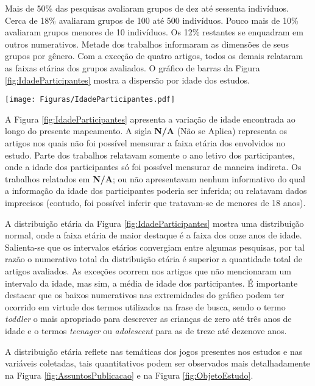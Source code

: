 \documentclass[12pt]{article}
\begin{document}
Mais de 50\% das pesquisas avaliaram grupos de dez até sessenta indivíduos. Cerca de 18\% avaliaram grupos de 100 até 500 indivíduos. Pouco mais de 10\% avaliaram grupos menores de 10 indivíduos. Os 12\% restantes se enquadram em outros numerativos. Metade dos trabalhos informaram as dimensões de seus grupos por gênero. Com a exceção de quatro artigos, todos os demais relataram as faixas etárias dos grupos avaliados. O gráfico de barras da Figura \ref{fig:IdadeParticipantes} mostra a dispersão por idade dos estudos.

\pagebreak

\begin{figure*}[ht]
\centering
\texttt{[image: Figuras/IdadeParticipantes.pdf]}
\caption{Distribuição da idade dos participantes dos artigos}\label{fig:IdadeParticipantes}
\end{figure*}

A Figura \ref{fig:IdadeParticipantes} apresenta a variação de idade encontrada ao longo do presente mapeamento. A sigla \textbf{N/A} (Não se Aplica) representa os artigos nos quais não foi possível mensurar a faixa etária dos envolvidos no estudo. Parte dos trabalhos relatavam somente o ano letivo dos participantes, onde a idade dos participantes só foi possível mensurar de maneira indireta. Os trabalhos relatados em \textbf{N/A}; ou não apresentavam nenhum informativo do qual a informação da idade dos participantes poderia ser inferida; ou relatavam dados imprecisos (contudo, foi possível inferir que tratavam-se de menores de 18 anos).%

A distribuição etária da Figura \ref{fig:IdadeParticipantes} mostra uma distribuição normal, onde a faixa etária de maior destaque é a faixa dos onze anos de idade. Salienta-se que os intervalos etários convergiam entre algumas pesquisas, por tal razão o numerativo total da distribuição etária é superior a quantidade total de artigos avaliados. As exceções ocorrem nos artigos que não mencionaram um intervalo da idade, mas sim, a média de idade dos participantes. É importante destacar que os baixos numerativos nas extremidades do gráfico podem ter ocorrido em virtude dos termos utilizados na frase de busca, sendo o termo \textit{toddler} o mais apropriado para descrever as crianças de zero até três anos de idade e o termos \textit{teenager} ou \textit{adolescent} para as de treze até dezenove anos. 

A distribuição etária reflete nas temáticas dos jogos presentes nos estudos e nas variáveis coletadas, tais quantitativos podem ser observados mais detalhadamente na Figura \ref{fig:AssuntosPublicacao} e na Figura \ref{fig:ObjetoEstudo}.
\end{document}

